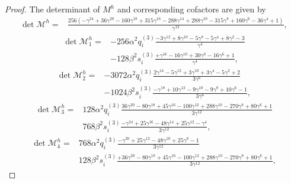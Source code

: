 \documentclass[11pt,letterpaper]{amsart}
\newcommand{\mM}{\mathcal{M}}
\theoremstyle{definition}
\theoremstyle{remark}
\numberwithin{equation}{section}
\begin{document}
\begin{proof}
The determinant of $M^h$ and corresponding cofactors are given by
\begin{equation}\label{determinant-of-M-e}
\begin{split}
\det \mM^h=& \frac{256(-\gamma^{24} + 36\gamma^{20} - 160\gamma^{18} + 315\gamma^{16} - 288\gamma^{14} + 288\gamma^{10} - 315\gamma^8 + 160\gamma^6 - 36\gamma^4 + 1)}{\gamma^{12}},
\end{split}
\end{equation}
\begin{equation}
\begin{split}
\det \mM^h_1=&-256\alpha^2 q^{(3)}_i \frac{ -3\gamma^{12} + 8\gamma^{10}  - 5\gamma^8  - 5\gamma^4  + 8\gamma^2 - 3}{\gamma^4}\\
&-128\beta^2 s^{(3)}_i\frac{+ \gamma^{16} - 16\gamma^{10}+ 30\gamma^8 - 16\gamma^6 + 1 }{\gamma^4},
\end{split}
\end{equation}
\begin{equation}
\begin{split}
\det \mM^h_2=&-3072\alpha^2 q^{(3)}_i \frac{
      2\gamma^{14} - 5\gamma^{12} + 3\gamma^{10} + 3\gamma^4 - 5\gamma^2  + 2}{3\gamma^6}\\
      &-1024\beta^2 s^{(3)}_i\frac{- \gamma^{18} + 10\gamma^{12}  - 9\gamma^{10} - 9\gamma^8  + 10\gamma^6  - 1}{3\gamma^6},
\end{split}
\end{equation}
\begin{equation}
\begin{split}
\det \mM^h_3=&128\alpha^2 q^{(3)}_i \frac{
    36\gamma^{20} - 80\gamma^{18} + 45\gamma^{16}  - 100\gamma^{12} + 288\gamma^{10}  - 270\gamma^8 + 80\gamma^6  + 1}{3\gamma^{12}}\\
    & 768\beta^2 s^{(3)}_i\frac{- \gamma^{24}  + 25\gamma^{16} - 48\gamma^{14} + 25\gamma^{12} - \gamma^4
  }{3\gamma^{12}},
\end{split}
\end{equation}
\begin{equation}
\begin{split}
\det \mM^h_4=& 768\alpha^2 q^{(3)}_i\frac{
      -\gamma^{20}  + 25\gamma^{12} - 48\gamma^{10} +25\gamma^8  - 1 }{3\gamma^{12}}  \\
      &128\beta^2 s^{(3)}_i\frac{+ 36\gamma^{20}  - 80\gamma^{18}  + 45\gamma^{16}  - 100\gamma^{12}  + 288\gamma^{10}  - 270\gamma^8  + 80\gamma^6  + 1
  }{3\gamma^{12}},  
\end{split}
\end{equation}


\end{proof}
\end{document}
